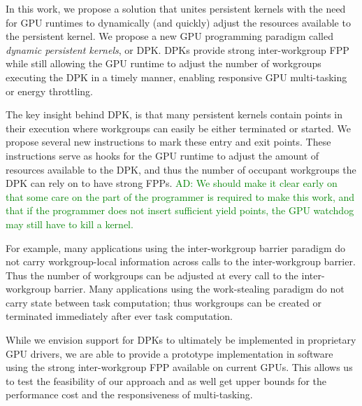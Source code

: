 \documentclass[nocopyrightspace]{sigplanconf-pldi16}
\newcommand{\ADComment}[1]{\textcolor{green}{AD: #1}}
\begin{document}
In this work, we propose a solution that unites persistent kernels
with the need for GPU runtimes to dynamically (and quickly) adjust the
resources available to the persistent kernel. We propose a new GPU
programming paradigm called \emph{dynamic persistent kernels}, or
DPK. DPKs provide strong inter-workgroup FPP while still allowing the
GPU runtime to adjust the number of workgroups executing the DPK in a
timely manner, enabling responsive GPU multi-tasking or energy
throttling.

The key insight behind DPK, is that many persistent kernels contain
points in their execution where workgroups can easily be either
terminated or started. We propose several new instructions to mark
these entry and exit points. These instructions serve as hooks for the
GPU runtime to adjust the amount of resources available to the DPK,
and thus the number of occupant workgroups the DPK can rely on to have
strong FPPs. \ADComment{We should make it clear early on that some care on the part of the programmer is required to make this work, and that if the programmer does not insert sufficient yield points, the GPU watchdog may still have to kill a kernel.}

For example, many applications using the inter-workgroup barrier
paradigm do not carry workgroup-local information across calls to the
inter-workgroup barrier. Thus the number of workgroups can be adjusted
at every call to the inter-workgroup barrier. Many applications using
the work-stealing paradigm do not carry state between task
computation; thus workgroups can be created or terminated immediately
after ever task computation.

While we envision support for DPKs to ultimately be implemented in
proprietary GPU drivers, we are able to provide a prototype
implementation in software using the strong inter-workgroup FPP
available on current GPUs. This allows us to test the feasibility of
our approach and as well get upper bounds for the performance cost and
the responsiveness of multi-tasking.
\end{document}
